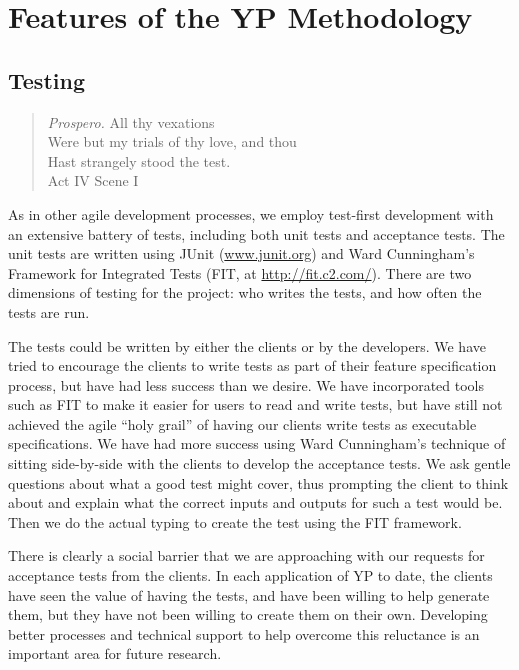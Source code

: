 \documentclass[times, 10pt,twocolumn]{article}
\begin{document}
\section{Features of the YP Methodology}
\label{features}

\subsection{Testing}
\label{testing}

\begin{quote}
\emph{Prospero.} 
All thy vexations \\
Were but my trials of thy love, and thou \\
Hast strangely stood the test. \\
\hspace*{1cm} Act IV Scene I
\end{quote}

As in other agile development processes, we employ test-first development
with an extensive battery of tests, including both unit tests and
acceptance tests.   The unit tests are written using 
JUnit (\url{www.junit.org})
and Ward Cunningham's Framework for Integrated Tests (FIT, at
\url{http://fit.c2.com/}).
There are two dimensions of testing for the project: who
writes the tests, and how often the tests are run.

The tests could be written by either the clients or by the developers.  We
have tried to encourage the clients to write tests as part of their feature
specification process, but have had less success than we desire.  We have
incorporated tools such as FIT
to make it easier for users to read and write tests, but have still
not achieved the agile ``holy grail'' of having our clients write tests as
executable specifications.
We have had more success using Ward Cunningham's technique of sitting
side-by-side with the clients to develop the acceptance tests.  We ask
gentle questions about what a good test might cover, thus prompting the
client to think about and explain what the correct inputs and outputs for
such a test would be.  Then we do the actual typing to create the test
using the FIT framework.

There is clearly a social barrier that we are approaching with our requests
for acceptance tests from the clients.  In each application of YP to date,
the clients have seen the value of having the tests, and have been willing
to help generate them, but they have not been willing to create them on
their own.  Developing better processes and technical support to help
overcome this reluctance is an important area for future research.
\end{document}
